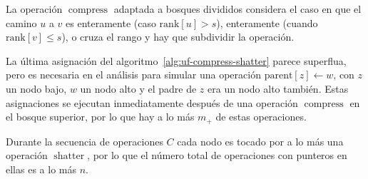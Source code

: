   La operación \(\operatorname{compress}\) adaptada a bosques divididos
  considera el caso en que el camino \(u\) a \(v\)
  es enteramente 
  (caso \(\mathrm{rank}[u] > s\)),
  enteramente 
  (cuando \(\mathrm{rank}[v] \le s\)),
  o cruza el rango y hay que subdividir la operación.

  La última asignación del algoritmo~\ref{alg:uf-compress-shatter}
  parece superflua,
  pero es necesaria en el análisis para simular una operación
  \(\mathrm{parent}[z] \leftarrow w\),
  con \(z\) un nodo bajo,
  \(w\) un nodo alto y el padre de \(z\) era un nodo alto también.
  Estas asignaciones  se ejecutan inmediatamente después
  de una operación \(\operatorname{compress}\) en el bosque superior,
  por lo que hay a lo más \(m_+\) de estas operaciones.

  Durante la secuencia de operaciones \(C\) cada nodo es tocado
  por a lo más una operación \(\operatorname{shatter}\),
  por lo que el número total de operaciones con punteros en ellas
  es a lo más \(n\).

